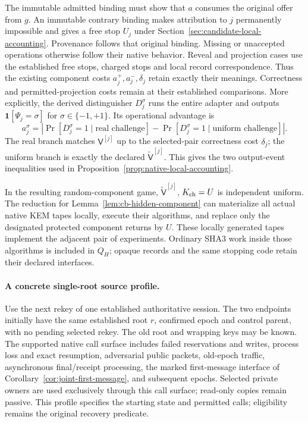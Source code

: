 \documentclass[pdflatex]{sn-jnl}
\theoremstyle{thmstyleone}
\theoremstyle{thmstylethree}
\theoremstyle{thmstyletwo}
\begin{document}
The immutable admitted binding must show that $a$ consumes the original
offer from $g$. An immutable contrary binding makes attribution to $j$
permanently impossible and gives a free stop $U_j$ under
Section~\ref{sec:candidate-local-accounting}. Provenance follows that
original binding. Missing or unaccepted operations otherwise follow their
native behavior. Reveal and projection cases use the established free
stops, charged stops and local record correspondence. Thus the existing
component costs $a_j^+,a_j^-,\delta_j$ retain exactly their meanings.
Correctness and permitted-projection costs remain at their established
comparisons.
More explicitly, the derived distinguisher $D_j^\sigma$ runs the entire
adapter and outputs $\mathbf1[\Psi_j=\sigma]$ for
$\sigma\in\{-1,+1\}$. Its operational advantage is
\[
 a_j^\sigma=\left|\Pr[D_j^\sigma=1\mid\text{real challenge}]
                    -\Pr[D_j^\sigma=1\mid\text{uniform challenge}]\right|.
\]
The real branch matches $\mathsf V^{[j]}$ up to the selected-pair
correctness cost $\delta_j$; the uniform branch is exactly the declared
$\widetilde{\mathsf V}^{[j]}$. This gives the two output-event
inequalities used in Proposition~\ref{prop:native-local-accounting}.

In the resulting random-component game,
$\widetilde{\mathsf V}^{[j]}$, $K_{\rm ch}=U$ is independent uniform.
The reduction for Lemma~\ref{lem:cb-hidden-component} can materialize all
actual native KEM tapes locally, execute their algorithms, and replace
only the designated protected component returns by $U$. These locally
generated tapes implement the adjacent pair of experiments. Ordinary SHA3 work
inside those algorithms is included in $Q_H$; opaque records and the same
stopping code retain their declared interfaces.

\paragraph{A concrete single-root source profile.}
Use the next rekey of one established authoritative session. The two
endpoints initially have the same established root $r$, confirmed epoch
and control parent, with no pending selected rekey. The old root and
wrapping keys may be known. The supported native call surface includes
failed reservations and writes, process loss and exact resumption,
adversarial public packets, old-epoch traffic, asynchronous final/receipt
processing, the marked first-message interface of
Corollary~\ref{cor:joint-first-message}, and subsequent epochs. Selected
private owners are used exclusively through this call surface; read-only
copies remain passive.
This profile specifies the starting state and permitted calls; eligibility
remains the original recovery predicate.
\end{document}
